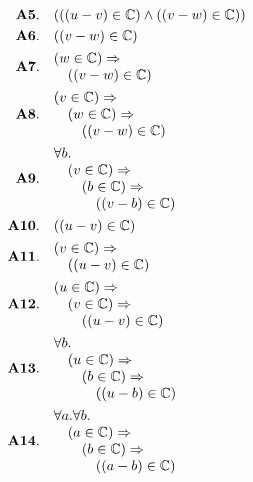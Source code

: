 \documentclass[11pt]{article}
\theoremstyle{plain}
\begin{document}
\begin{align*}
  \mathbf{A5.}\quad & (((u - v) \in \mathbb{C}) \wedge ((v - w) \in \mathbb{C})) \\
  \mathbf{A6.}\quad & ((v - w) \in \mathbb{C}) \\
  \mathbf{A7.}\quad & \begin{array}{@{}l@{}} (w \in \mathbb{C}) \Rightarrow  \\ \quad ((v - w) \in \mathbb{C}) \end{array} \\
  \mathbf{A8.}\quad & \begin{array}{@{}l@{}} (v \in \mathbb{C}) \Rightarrow  \\ \quad (w \in \mathbb{C}) \Rightarrow  \\ \quad \quad ((v - w) \in \mathbb{C}) \end{array} \\
  \mathbf{A9.}\quad & \begin{array}{@{}l@{}} \forall b. \\ \quad (v \in \mathbb{C}) \Rightarrow  \\ \quad \quad (b \in \mathbb{C}) \Rightarrow  \\ \quad \quad \quad ((v - b) \in \mathbb{C}) \end{array} \\
  \mathbf{A10.}\quad & ((u - v) \in \mathbb{C}) \\
  \mathbf{A11.}\quad & \begin{array}{@{}l@{}} (v \in \mathbb{C}) \Rightarrow  \\ \quad ((u - v) \in \mathbb{C}) \end{array} \\
  \mathbf{A12.}\quad & \begin{array}{@{}l@{}} (u \in \mathbb{C}) \Rightarrow  \\ \quad (v \in \mathbb{C}) \Rightarrow  \\ \quad \quad ((u - v) \in \mathbb{C}) \end{array} \\
  \mathbf{A13.}\quad & \begin{array}{@{}l@{}} \forall b. \\ \quad (u \in \mathbb{C}) \Rightarrow  \\ \quad \quad (b \in \mathbb{C}) \Rightarrow  \\ \quad \quad \quad ((u - b) \in \mathbb{C}) \end{array} \\
  \mathbf{A14.}\quad & \begin{array}{@{}l@{}} \forall a. \forall b. \\ \quad (a \in \mathbb{C}) \Rightarrow  \\ \quad \quad (b \in \mathbb{C}) \Rightarrow  \\ \quad \quad \quad ((a - b) \in \mathbb{C}) \end{array} \\

\end{align*}
\end{document}
